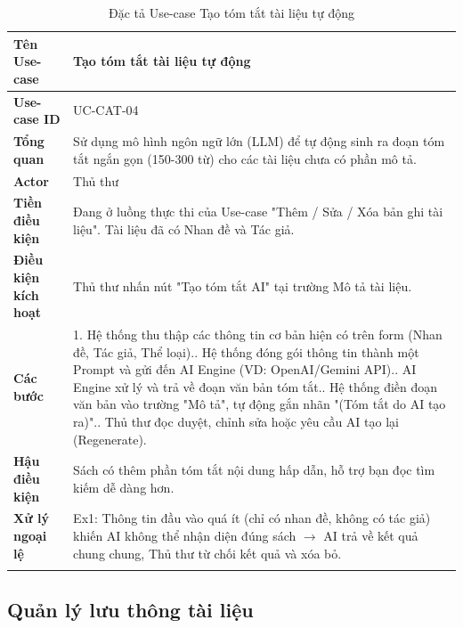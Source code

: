 \newpage
\begin{longtable}{|p{3.5cm}|p{11.5cm}|}
    \hline
    \textbf{Tên Use-case} & \textbf{Tạo tóm tắt tài liệu tự động} \\
    \hline
    \textbf{Use-case ID} & UC-CAT-04 \\
    \hline
    \textbf{Tổng quan} & Sử dụng mô hình ngôn ngữ lớn (LLM) để tự động sinh ra đoạn tóm tắt ngắn gọn (150-300 từ) cho các tài liệu chưa có phần mô tả. \\
    \hline
    \textbf{Actor} & Thủ thư \\
    \hline
    \textbf{Tiền điều kiện} & Đang ở luồng thực thi của Use-case "Thêm / Sửa / Xóa bản ghi tài liệu". Tài liệu đã có Nhan đề và Tác giả. \\
    \hline
    \textbf{Điều kiện kích hoạt} & Thủ thư nhấn nút "Tạo tóm tắt AI" tại trường Mô tả tài liệu. \\
    \hline
    \textbf{Các bước} & 
    1. Hệ thống thu thập các thông tin cơ bản hiện có trên form (Nhan đề, Tác giả, Thể loại).\newline
    2. Hệ thống đóng gói thông tin thành một Prompt và gửi đến AI Engine (VD: OpenAI/Gemini API).\newline
    3. AI Engine xử lý và trả về đoạn văn bản tóm tắt.\newline
    4. Hệ thống điền đoạn văn bản vào trường "Mô tả", tự động gắn nhãn "(Tóm tắt do AI tạo ra)".\newline
    5. Thủ thư đọc duyệt, chỉnh sửa hoặc yêu cầu AI tạo lại (Regenerate). \\
    \hline
    \textbf{Hậu điều kiện} & Sách có thêm phần tóm tắt nội dung hấp dẫn, hỗ trợ bạn đọc tìm kiếm dễ dàng hơn. \\
    \hline
    \textbf{Xử lý ngoại lệ} & 
    Ex1: Thông tin đầu vào quá ít (chỉ có nhan đề, không có tác giả) khiến AI không thể nhận diện đúng sách $\rightarrow$ AI trả về kết quả chung chung, Thủ thư từ chối kết quả và xóa bỏ. \\
    \hline
    \caption{Đặc tả Use-case Tạo tóm tắt tài liệu tự động}
\end{longtable}

\subsection{Quản lý lưu thông tài liệu}

